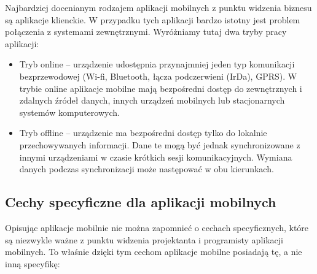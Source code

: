 Najbardziej docenianym rodzajem aplikacji mobilnych z punktu widzenia biznesu są aplikacje klienckie. W przypadku tych aplikacji bardzo istotny jest problem połączenia z systemami zewnętrznymi. Wyróżniamy tutaj dwa tryby pracy aplikacji:

\begin{itemize}
\item Tryb online -- urządzenie udostępnia przynajmniej jeden typ komunikacji bezprzewodowej (Wi-fi, Bluetooth, łącza podczerwieni (IrDa), GPRS). W trybie online aplikacje mobilne mają bezpośredni dostęp do zewnętrznych i zdalnych źródeł danych, innych urządzeń mobilnych lub stacjonarnych systemów komputerowych.   
\item Tryb offline -- urządzenie ma bezpośredni dostęp tylko do lokalnie przechowywanych informacji. Dane te mogą być jednak synchronizowane z innymi urządzeniami w czasie krótkich sesji komunikacyjnych. Wymiana danych podczas synchronizacji może następować w obu kierunkach. 
\end{itemize}

\subsection{Cechy specyficzne dla aplikacji mobilnych }
\label{sec:cechyAplikacjiMobilnych}

Opisując aplikacje mobilnie nie można zapomnieć o cechach specyficznych, które są niezwykle ważne z punktu widzenia projektanta i programisty aplikacji mobilnych. To właśnie dzięki tym cechom aplikacje mobilne posiadają tę, a nie inną specyfikę:

